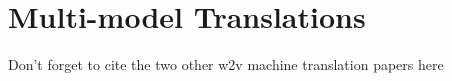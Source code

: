 \section{Multi-model Translations}
\label{sec:multi-model-translations}

Don't forget to cite the two other w2v machine translation papers here